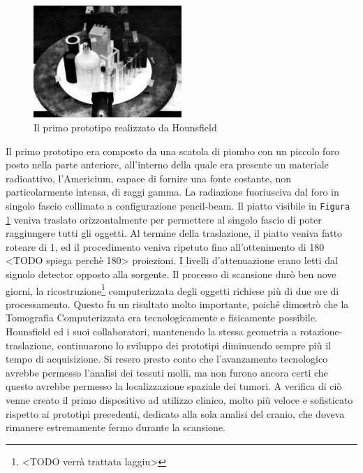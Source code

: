 \documentclass[a4paper,11pt, oneside]{article}
\begin{document}
                    \begin{figure}[h]
                        \centering
                        \includegraphics[width=0.5\textwidth]{first-prototype}
                        \caption{Il primo prototipo realizzato da Hounsfield}
                        \label{fig:prototype}
                    \end{figure}
                            
                    Il primo prototipo era composto da una scatola di piombo con un piccolo foro posto nella parte anteriore, all’interno della quale era presente un materiale radioattivo, l’Americium, capace di fornire una fonte costante, non particolarmente intensa, di raggi gamma. La radiazione fuoriusciva dal foro in singolo fascio collimato a configurazione pencil-beam. Il piatto visibile in \texttt{Figura \ref{fig:prototype}} veniva traslato orizzontalmente per permettere al singolo fascio di poter raggiungere tutti gli oggetti. Al termine della traslazione, il piatto veniva fatto roteare di 1\degree, ed il procedimento veniva ripetuto fino all'ottenimento di 180 <TODO spiega perchè 180> proiezioni. I livelli d'attenuazione erano letti dal signolo detector opposto alla sorgente. Il processo di scansione durò ben nove giorni, la ricostruzione\footnote{<TODO verrà trattata laggiu>} computerizzata degli oggetti richiese più di due ore di processamento. Questo fu un risultato molto importante, poiché dimostrò che la Tomografia Computerizzata era tecnologicamente e fisicamente possibile.
                    Hounsfield ed i suoi collaboratori, mantenendo la stessa geometria a rotazione-traslazione, continuarono lo sviluppo dei prototipi diminuendo sempre più il tempo di acquisizione. Si resero presto conto che l'avanzamento tecnologico avrebbe permesso l'analisi dei tessuti molli, ma non furono ancora certi che questo avrebbe permesso la localizzazione spaziale dei tumori. A verifica di ciò venne creato il primo dispositivo ad utilizzo clinico, molto più veloce e sofisticato rispetto ai prototipi precedenti, dedicato alla sola analisi del cranio, che doveva rimanere estremamente fermo durante la scansione.
                            
\end{document}

